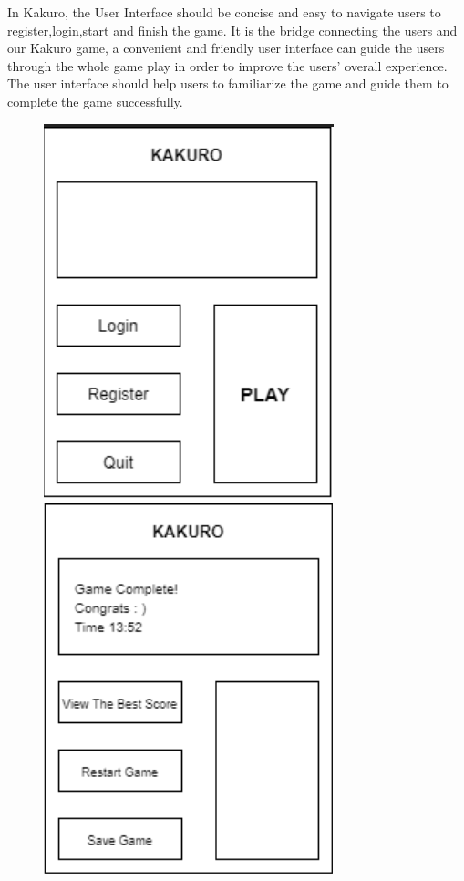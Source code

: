 \documentclass[12pt]{article}
\begin{document}
In Kakuro, the User Interface should be concise and easy to navigate users to register,login,start and finish the game. It is the bridge connecting the users and our Kakuro game, a convenient and friendly user interface can guide the users through the whole game play in order to improve the users' overall experience. The user interface should help users to familiarize the game and guide them to complete the game successfully.

\begin{figure}[htbp]
    \centering
    \includegraphics[scale=0.5]{iteration1/images/UI2.png}
      \includegraphics[scale=0.5]{iteration1/images/UI3.png}

\end{figure}
\end{document}
